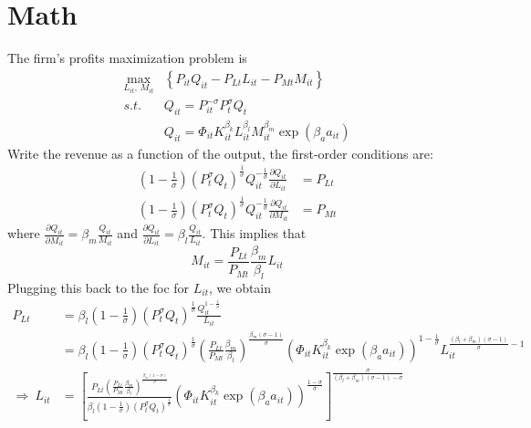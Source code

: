 \documentclass[English]{article}
\begin{document}
\section{Math}
The firm's profits maximization problem is
\begin{align*}
\max_{L_{it},\,M_{it}} & \left\{ P_{it}Q_{it}-P_{Lt}L_{it}-P_{Mt}M_{it}\right\} \\
s.t.\, & Q_{it}=P_{it}^{-\sigma}P_{t}^{\sigma}Q_{t}\\
 & Q_{it}=\Phi_{it}K_{it}^{\beta_{k}}L_{it}^{\beta_{l}}M_{it}^{\beta_{m}}\exp\left(\beta_{a}a_{it}\right)
\end{align*}
Write the revenue as a function of the output, the first-order conditions
are:
\begin{align}
\left(1-\frac{1}{\sigma}\right)\left(P_{t}^{\sigma}Q_{t}\right)^{\frac{1}{\sigma}}Q_{it}^{-\frac{1}{\sigma}}\frac{\partial Q_{it}}{\partial L_{it}} & =P_{Lt}\\
\left(1-\frac{1}{\sigma}\right)\left(P_{t}^{\sigma}Q_{t}\right)^{\frac{1}{\sigma}}Q_{it}^{-\frac{1}{\sigma}}\frac{\partial Q_{it}}{\partial M_{it}} & =P_{Mt}
\end{align}
where $\frac{\partial Q_{it}}{\partial M_{it}}=\beta_{m}\frac{Q_{it}}{M_{it}}$
and $\frac{\partial Q_{it}}{\partial L_{it}}=\beta_{l}\frac{Q_{it}}{L_{it}}$.
This implies that 
\begin{equation}
M_{it}=\frac{P_{Lt}}{P_{Mt}}\frac{\beta_{m}}{\beta_{l}}L_{it}
\end{equation}
Plugging this back to the foc for $L_{it}$, we obtain
\begin{align}
P_{Lt} & =\beta_{l}\left(1-\frac{1}{\sigma}\right)\left(P_{t}^{\sigma}Q_{t}\right)^{\frac{1}{\sigma}}\frac{Q_{it}^{1-\frac{1}{\sigma}}}{L_{it}}\nonumber \\
 & =\beta_{l}\left(1-\frac{1}{\sigma}\right)\left(P_{t}^{\sigma}Q_{t}\right)^{\frac{1}{\sigma}}\left(\frac{P_{Lt}}{P_{Mt}}\frac{\beta_{m}}{\beta_{l}}\right)^{\frac{\beta_{m}\left(\sigma-1\right)}{\sigma}}\left(\Phi_{it}K_{it}^{\beta_{k}}\exp\left(\beta_{a}a_{it}\right)\right)^{1-\frac{1}{\sigma}}L_{it}^{\frac{\left(\beta_{l}+\beta_{m}\right)\left(\sigma-1\right)}{\sigma}-1}\nonumber \\
\Rightarrow\:L_{it} & =\left[\frac{P_{Lt}\left(\frac{P_{Lt}}{P_{Mt}}\frac{\beta_{m}}{\beta_{l}}\right)^{\frac{\beta_{m}\left(1-\sigma\right)}{\sigma}}}{\beta_{l}\left(1-\frac{1}{\sigma}\right)\left(P_{t}^{\sigma}Q_{t}\right)^{\frac{1}{\sigma}}}\left(\Phi_{it}K_{it}^{\beta_{k}}\exp\left(\beta_{a}a_{it}\right)\right)^{\frac{1-\sigma}{\sigma}}\right]^{\frac{\sigma}{\left(\beta_{l}+\beta_{m}\right)\left(\sigma-1\right)-\sigma}}
\end{align}
\end{document}
